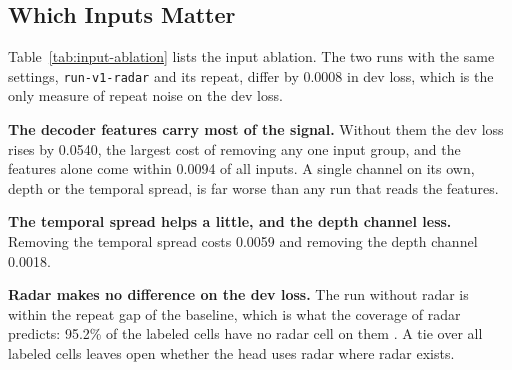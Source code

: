 \subsection{Which Inputs Matter}
\label{sec:input-ablation}

Table~\ref{tab:input-ablation} lists the input ablation. The two runs with the same settings, \texttt{run-v1-radar} and its repeat, differ by 0.0008 in dev loss, which is the only measure of repeat noise on the dev loss. 

\textbf{The decoder features carry most of the signal.} Without them the dev loss rises by 0.0540, the largest cost of removing any one input group, and the features alone come within 0.0094 of all inputs. A single channel on its own, depth or the temporal spread, is far worse than any run that reads the features.

\textbf{The temporal spread helps a little, and the depth channel less.} Removing the temporal spread costs 0.0059 and removing the depth channel 0.0018.

\textbf{Radar makes no difference on the dev loss.} The run without radar is within the repeat gap of the baseline, which is what the coverage of radar predicts: 95.2\% of the labeled cells have no radar cell on them . A tie over all labeled cells leaves open whether the head uses radar where radar exists. 

